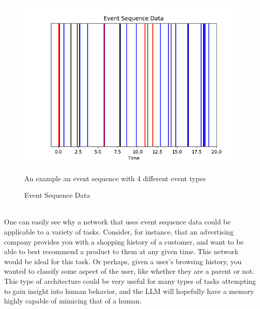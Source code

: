 \begin{figure}
    \centering
    \includegraphics[width=1.0\textwidth]{figures/Event_Sequence.png}
    \caption{Event Sequence Data}
    \label{fig:Event_seq}
    An example an event sequence with 4 different event types
    
\end{figure}
\textit{ }\\ One can easily see why a network that uses event sequence data could be applicable to a variety of tasks. Consider, for instance, that an advertising company provides you with a shopping history of a customer, and want to be able to best recommend a product to them at any given time. This network would be ideal for this task. Or perhaps, given a user's browsing history, you wanted to classify some aspect of the user, like whether they are a parent or not. This type of architecture could be very useful for many types of tasks attempting to gain insight into human behavior, and the LLM will hopefully have a memory highly capable of mimicing that of a human. 